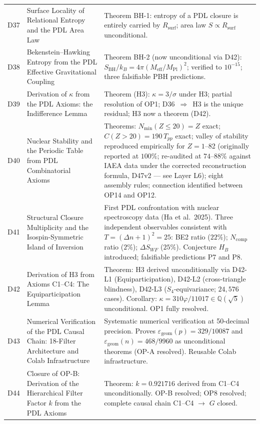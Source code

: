 \documentclass[11pt,a4paper]{article}
\theoremstyle{plain}
\theoremstyle{definition}
\theoremstyle{remark}
\newcommand{\Rsurf}{R_{\mathrm{surf}}}
\newcommand{\SBH}{S_{\mathrm{BH}}}
\newcommand{\Meff}{M_{\mathrm{eff}}}
\newcommand{\MPl}{M_{\mathrm{Pl}}}
\newcommand{\Tpp}{T_{pp}}
\begin{document}
\begin{longtable}{L{1.3cm}L{3.8cm}L{8.0cm}}
D37 & Surface Locality of Relational Entropy and the PDL Area Law~\cite{D37} & \textcolor{proofblue}{Theorem BH-1}: entropy of a PDL closure is entirely carried by $\Rsurf$; area law $S\propto\Rsurf$ unconditional.\\[0.3em]
D38 & Bekenstein--Hawking Entropy from the PDL Effective Gravitational Coupling~\cite{D38} & \textcolor{proofblue}{Theorem BH-2} (now unconditional via D42): $\SBH/k_B=4\pi(\Meff/\MPl)^2$; verified to $10^{-15}$; three falsifiable PBH predictions.\\[0.3em]
D39 & Derivation of $\kappa$ from the PDL Axioms: the Indifference Lemma~\cite{D39} & \textcolor{proofblue}{Theorem (H3)}: $\kappa=3/\sigma$ under H3; partial resolution of OP1; D36~$\Rightarrow$~H3 is the unique residual; H3 now a theorem (D42).\\[0.4em]
D40 & Nuclear Stability and the Periodic Table from PDL Combinatorial Axioms~\cite{D40} & \textcolor{proofblue}{Theorems}: $N_{\min}(Z\leq20)=Z$ exact; $C(Z>20)=190\,\Tpp$ exact; valley of stability reproduced empirically for $Z=1$--82 (originally reported at $100\%$; re-audited at $74$--$88\%$ against IAEA data under the corrected reconstruction formula, D47v2 --- see Layer L6); eight assembly rules; connection identified between OP14 and OP12.\\[0.4em]
D41 & Structural Closure Multiplicity and the Isospin-Symmetric Island of Inversion~\cite{D41} & First PDL confrontation with nuclear spectroscopy data (Ha et al.~2025). Three independent observables consistent with $T=(\Delta n+1)^2=25$: BE2 ratio ($22\%$); $N_{\mathrm{comp}}$ ratio ($2\%$); $\Delta S_{WF}$ ($25\%$). Conjecture $H_B$ introduced; falsifiable predictions P7 and P8.\\[0.4em]
D42 & Derivation of H3 from Axioms C1--C4: The Equiparticipation Lemma~\cite{D42} & \textcolor{proofblue}{Theorem}: H3 derived unconditionally via D42-L1 (Equiparticipation), D42-L2 (cross-triangle blindness), D42-L3 ($S_4$-equivariance; $24{,}576$ cases). Corollary: $\kappa=310\varphi/11017\in\mathbb{Q}(\sqrt{5})$ unconditional. OP1 fully resolved.\\[0.4em]
D43 & Numerical Verification of the PDL Causal Chain: 18-Filter Architecture and Colab Infrastructure~\cite{D43} & Systematic numerical verification at 50-decimal precision. Proves $\varepsilon_{\mathrm{geom}}(p) = 329/10087$ and $\varepsilon_{\mathrm{geom}}(n) = 468/9960$ as unconditional theorems (OP-A resolved). Reusable Colab infrastructure.\\[0.4em]
D44 & Closure of OP-B: Derivation of the Hierarchical Filter Factor $k$ from the PDL Axioms~\cite{D44} & \textcolor{proofblue}{Theorem}: $k = 0.921716$ derived from C1--C4 unconditionally. OP-B resolved; OP8 resolved; complete causal chain C1--C4 $\to$ $G$ closed.\\[0.4em]

\end{longtable}
\end{document}
